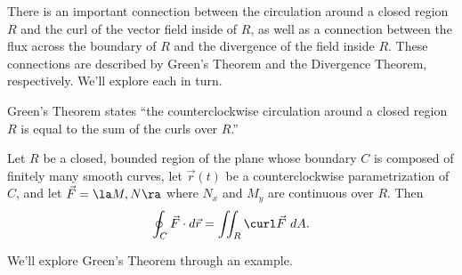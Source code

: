 There is an important connection between the circulation around a closed region $R$ and the curl of the vector field inside of $R$, as well as a connection between the flux across the boundary of $R$ and the divergence of the field inside $R$. These connections are described by Green's Theorem and the Divergence Theorem, respectively. We'll explore each in turn.

Green's Theorem states ``the counterclockwise circulation around a closed region $R$ is equal to the sum of the curls over $R$.''

{Let $R$ be a closed, bounded region of the plane whose boundary $C$ is composed of finitely many smooth curves, let $\vec r(t)$ be a counterclockwise parametrization of $C$, and let $\vec F =\la M,N\ra$ where $N_x$ and $M_y$ are continuous over $R$. Then
$$\oint_C \vec F\cdot d\vec r = \iint_R\curl \vec F\ dA.$$
}

We'll explore Green's Theorem through an example. \\

